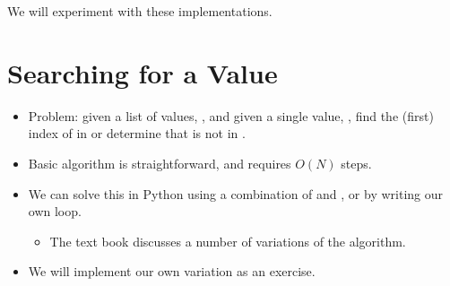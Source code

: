 \documentclass[letterpaper,10pt,english]{sphinxmanual}
\begin{document}
\begin{itemize}
\begin{sphinxVerbatim}[commandchars=\\\{\}]
      
       
        
      
\end{sphinxVerbatim}

\end{itemize}

We will experiment with these implementations.


\section{Searching for a Value}
\label{\detokenize{lecture_notes/lec20_searching:searching-for-a-value}}\begin{itemize}
\item {} 
Problem: given a list of values, , and given a single value,
, find the (first) index of  in  or determine that
 is not in .

\item {} 
Basic algorithm is straightforward, and requires \(O(N)\) steps.

\item {} 
We can solve this in Python using a combination of  and
, or by writing our own loop.
\begin{itemize}
\item {} 
The text book discusses a number of variations of the algorithm.

\end{itemize}

\item {} 
We will implement our own variation as an exercise.

\end{itemize}
\end{document}
